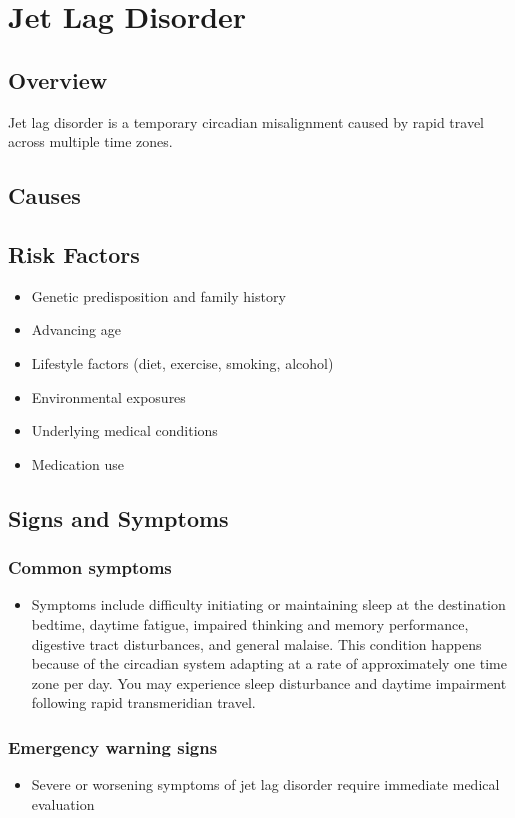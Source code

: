 \chapter{Jet Lag Disorder}
\label{sec:Jet Lag Disorder}

\section{Overview}
Jet lag disorder is a temporary circadian misalignment caused by rapid travel across multiple time zones.
\section{Causes}
\section{Risk Factors}

\begin{itemize}[noitemsep]
  \item Genetic predisposition and family history
  \item Advancing age
  \item Lifestyle factors (diet, exercise, smoking, alcohol)
  \item Environmental exposures
  \item Underlying medical conditions
  \item Medication use
\end{itemize}
\section{Signs and Symptoms}

\subsection{Common symptoms}
\begin{itemize}[noitemsep]
  \item Symptoms include difficulty initiating or maintaining sleep at the destination bedtime, daytime fatigue, impaired thinking and memory performance, digestive tract disturbances, and general malaise. This condition happens because of the circadian system adapting at a rate of approximately one time zone per day. You may experience sleep disturbance and daytime impairment following rapid transmeridian travel. 
  \end{itemize}

\subsection{Emergency warning signs}
\begin{itemize}[noitemsep]
  \item Severe or worsening symptoms of jet lag disorder require immediate medical evaluation
\end{itemize}
